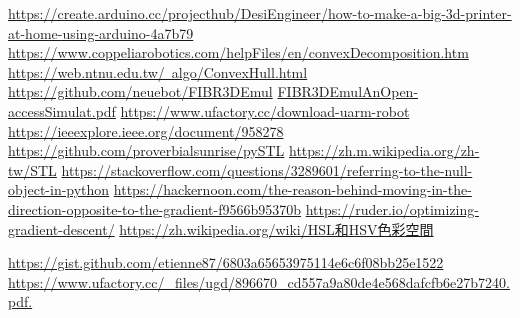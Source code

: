 \newpage
\renewcommand\bibname{參~考~文~獻}
\begin{thebibliography}{99}  %
\href{https://create.arduino.cc/projecthub/DesiEngineer/how-to-make-a-big-3d-printer-at-home-using-arduino-4a7b79}{https://create.arduino.cc/projecthub/DesiEngineer/how-to-make-a-big-3d-printer-at-home-using-arduino-4a7b79}
\href{https://www.coppeliarobotics.com/helpFiles/en/convexDecomposition.htm}{https://www.coppeliarobotics.com/helpFiles/en/convexDecomposition.htm}
\href{https://web.ntnu.edu.tw/~algo/ConvexHull.html}{https://web.ntnu.edu.tw/~algo/ConvexHull.html}
\href{https://github.com/neuebot/FIBR3DEmul}{https://github.com/neuebot/FIBR3DEmul}
\href{https://repositorium.sdum.uminho.pt/bitstream/1822/69730/1/Faria2020_Article_FIBR3DEmulAnOpen-accessSimulat.pdf}{FIBR3DEmulAnOpen-accessSimulat.pdf}
\href{https://www.ufactory.cc/download-uarm-robot}{https://www.ufactory.cc/download-uarm-robot}
\href{https://ieeexplore.ieee.org/document/958278}{https://ieeexplore.ieee.org/document/958278}
\href{https://github.com/proverbialsunrise/pySTL}{https://github.com/proverbialsunrise/pySTL}
\href{https://zh.m.wikipedia.org/zh-tw/STL}{https://zh.m.wikipedia.org/zh-tw/STL}
\href{https://stackoverflow.com/questions/3289601/referring-to-the-null-object-in-python}{https://stackoverflow.com/questions/3289601/referring-to-the-null-object-in-python}
\href{https://hackernoon.com/the-reason-behind-moving-in-the-direction-opposite-to-the-gradient-f9566b95370b}{https://hackernoon.com/the-reason-behind-moving-in-the-direction-opposite-to-the-gradient-f9566b95370b}\label{OGD}
\href{https://ruder.io/optimizing-gradient-descent/}{https://ruder.io/optimizing-gradient-descent/}
\label{OGD2}
\href{https://reurl.cc/43XjEL}{https://zh.wikipedia.org/wiki/HSL和HSV色彩空間}
\label{RGBtoHSV}


\href{https://gist.github.com/etienne87/6803a65653975114e6c6f08bb25e1522}{https://gist.github.com/etienne87/6803a65653975114e6c6f08bb25e1522}\label{R.pong2}
\href{https://www.ufactory.cc/_files/ugd/896670_cd557a9a80de4e568dafcfb6e27b7240.pdf.}{https://www.ufactory.cc/_files/ugd/896670_cd557a9a80de4e568dafcfb6e27b7240.pdf.}

%
\end{thebibliography}
\newpage 